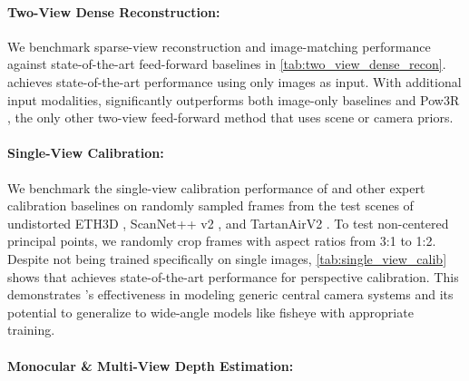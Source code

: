 \paragraph{Two-View Dense Reconstruction:}

We benchmark sparse-view reconstruction and image-matching performance against state-of-the-art feed-forward baselines in \cref{tab:two_view_dense_recon}.
\coolname achieves state-of-the-art performance using only images as input.
With additional input modalities, \coolname significantly outperforms both image-only baselines and Pow3R \cite{JangWLAR2025}, the only other two-view feed-forward method that uses scene or camera priors.




\paragraph{Single-View Calibration:}

We benchmark the single-view calibration performance of \coolname and other expert calibration baselines on randomly sampled frames from the test scenes of undistorted ETH3D \cite{SchoepSGSSPG2017}, ScanNet++ v2 \cite{YeshwLND2023}, and TartanAirV2 \cite{WangZWHQWHKS2020}.
To test non-centered principal points, we randomly crop frames with aspect ratios from 3:1 to 1:2.
Despite not being trained specifically on single images, \cref{tab:single_view_calib} shows that \coolname achieves state-of-the-art performance for perspective calibration.
This demonstrates \coolname's effectiveness in modeling generic central camera systems
and its potential to generalize to wide-angle models like fisheye with appropriate training.






\paragraph{Monocular \& Multi-View Depth Estimation:}
\label{subsec:depth_estimation}

